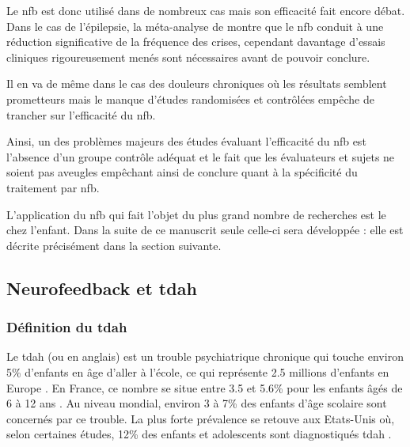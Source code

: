Le \gls{nfb} est donc utilisé dans de nombreux cas mais son efficacité fait encore débat. Dans le cas de l'épilepsie, la méta-analyse de \citet{Tan2009}
montre que le \gls{nfb} conduit à une réduction significative de la fréquence des crises, cependant davantage d'essais cliniques
rigoureusement menés sont nécessaires avant de pouvoir conclure. 

Il en va de même dans le cas des douleurs chroniques où les résultats semblent prometteurs \citep{Mayaud2019} mais le manque d'études randomisées et
contrôlées empêche de
trancher sur l'efficacité du \gls{nfb}.

Ainsi, un des problèmes majeurs des études évaluant l'efficacité du \gls{nfb} est l'absence d'un groupe contrôle adéquat et le fait que les évaluateurs et sujets
ne soient pas aveugles \citep{Thibault2017, Thibault2017climate, Jeunet2018} empêchant ainsi de conclure quant à la spécificité du traitement par \gls{nfb}.

L'application du \gls{nfb} qui fait l'objet du plus grand nombre de recherches est le  chez l'enfant. Dans la suite de ce manuscrit seule 
celle-ci sera développée : elle est décrite précisément dans la section suivante.

\subsection{Neurofeedback et \gls{tdah}} \label{nfb_and_adhd}

\subsubsection{Définition du \gls{tdah}}

Le \gls{tdah} (ou  en anglais) est un trouble psychiatrique chronique qui touche environ 5\% d'enfants en âge d'aller à l'école, 
ce qui représente 2.5 millions d'enfants en Europe \citep{DSM-5}. En France, ce nombre se situe entre 3.5 et 5.6\% pour les enfants âgés de 6 à 12 ans \citep{Lecendreux2011}. 
Au niveau mondial, environ 3 à 7\% des enfants d'âge scolaire sont concernés par ce trouble. La plus forte prévalence se retouve aux Etats-Unis où, selon certaines
études, 12\% des enfants et adolescents
sont diagnostiqués \gls{tdah} \citep{Collins2016}.

